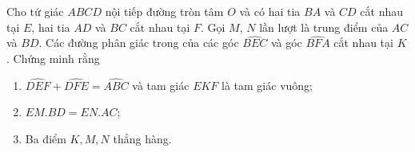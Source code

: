 \begin{bt}%
	Cho tứ giác $ABCD$ nội tiếp đường tròn tâm $O$ và có hai tia $BA$ và $CD$ cắt nhau tại $E$, hai tia $AD$ và $BC$ cắt nhau tại $F$. Gọi $M$, $N$ lần lượt là trung điểm của $AC$ và $BD$. Các đường phân giác trong của các góc $\widehat{BEC}$ và góc $\widehat{BFA}$ cắt nhau tại $K$. Chứng minh rằng
	\begin{enumerate}
		\item $\widehat{DEF}+\widehat{DFE}=\widehat{ABC}$ và tam giác $EKF$ là tam giác vuông;
		\item $EM.BD=EN.AC$;
		\item Ba điểm $K, M, N$ thẳng hàng.
	\end{enumerate}
	\loigiai
	{
		\begin{center}
\end{center}}
\end{bt}
